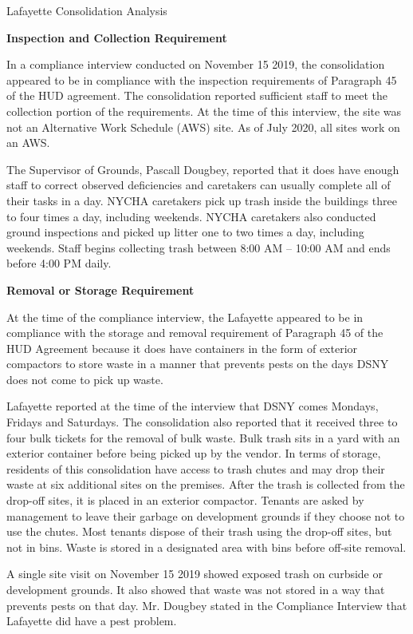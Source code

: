Lafayette Consolidation Analysis

\textbf{Inspection and Collection Requirement}

In a compliance interview conducted on November 15 2019, the consolidation appeared to be in compliance with the inspection requirements of Paragraph 45 of the HUD agreement. The consolidation reported sufficient staff to meet the collection portion of the requirements. At the time of this interview, the site was not an Alternative Work Schedule (AWS) site. As of July 2020, all sites work on an AWS.

The Supervisor of Grounds, Pascall Dougbey, reported that it does have enough staff to correct observed deficiencies and caretakers can usually complete all of their tasks in a day. NYCHA caretakers pick up trash inside the buildings three to four times a day, including weekends. NYCHA caretakers also conducted ground inspections and picked up litter one to two times a day, including weekends. Staff begins collecting trash between 8:00 AM -- 10:00 AM and ends before 4:00 PM daily. 

\textbf{Removal or Storage Requirement}

At the time of the compliance interview, the Lafayette appeared to be in compliance with the storage and removal requirement of Paragraph 45 of the HUD Agreement because it does have containers in the form of exterior compactors to store waste in a manner that prevents pests on the days DSNY does not come to pick up waste.

Lafayette reported at the time of the interview that DSNY comes Mondays, Fridays and Saturdays. The consolidation also reported that it received three to four bulk tickets for the  removal of bulk waste. Bulk trash sits in a yard with an exterior container before being picked up by the vendor. In terms of storage, residents of this consolidation have access to trash chutes and may drop their waste at six additional sites on the premises. After the trash is collected from the drop-off sites, it is placed in an exterior compactor. Tenants are asked by management to leave their garbage on development grounds if they choose not to use the chutes. Most tenants dispose of their trash using the drop-off sites, but not in bins. Waste is stored in a designated area with bins before off-site removal. 

A single site visit on November 15 2019 showed exposed trash on curbside or development grounds. It also showed that waste was not stored in a way that prevents pests on that day. Mr. Dougbey stated in the Compliance Interview that Lafayette did have a pest problem.

